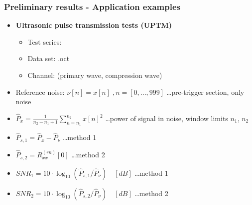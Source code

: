 \documentclass[11pt,aspectratio=169]{beamer}
\newcommand{\RPATH}{../../octave/results/test_acfrn}
\begin{document}
	\begin{frame}
		\frametitle{Preliminary results - Application examples}
		
		\begin{itemize}
			\item \textbf{Ultrasonic pulse transmission tests (UPTM)}
			\begin{itemize}
				\item Test series: 
				\item Data set: .oct\cite{dscempaste1}
				\item Channel:  (primary wave, compression wave)
			\end{itemize}
			\item Reference noise: $\nu[n] = x[n] \; , n = [0,...,999]$ \ldots pre-trigger section, only noise
			\item $\hat{P}_x = \frac{1}{n_2 - n_1 + 1} \sum\limits_{n=n_1}^{n_2} x[n]^2$ \ldots power of signal in noise, window limits $n_1$, $n_2$
			\item $\hat{P}_{s,1} = \hat{P}_x - \hat{P}_{\nu}$ \ldots method 1
			\item $\hat{P}_{s,2} = R_{xx}^{(rn)}[0]$ \ldots method 2
			\item $SNR_1 = 10 \cdot \log_{10} (\hat{P}_{s,1} / \hat{P}_{\nu}) \quad [dB]$ \ldots method 1
			\item $SNR_2 = 10 \cdot \log_{10} (\hat{P}_{s,2} / \hat{P}_{\nu}) \quad [dB]$ \ldots method 2
		\end{itemize}
	\end{frame}
\end{document}
